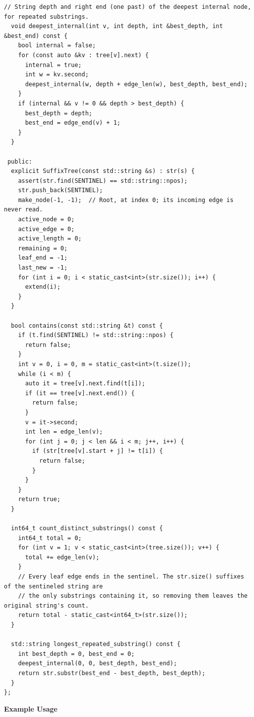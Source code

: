\begin{lstlisting}[style=cpp]
  // String depth and right end (one past) of the deepest internal node, for repeated substrings.
  void deepest_internal(int v, int depth, int &best_depth, int &best_end) const {
    bool internal = false;
    for (const auto &kv : tree[v].next) {
      internal = true;
      int w = kv.second;
      deepest_internal(w, depth + edge_len(w), best_depth, best_end);
    }
    if (internal && v != 0 && depth > best_depth) {
      best_depth = depth;
      best_end = edge_end(v) + 1;
    }
  }

 public:
  explicit SuffixTree(const std::string &s) : str(s) {
    assert(str.find(SENTINEL) == std::string::npos);
    str.push_back(SENTINEL);
    make_node(-1, -1);  // Root, at index 0; its incoming edge is never read.
    active_node = 0;
    active_edge = 0;
    active_length = 0;
    remaining = 0;
    leaf_end = -1;
    last_new = -1;
    for (int i = 0; i < static_cast<int>(str.size()); i++) {
      extend(i);
    }
  }

  bool contains(const std::string &t) const {
    if (t.find(SENTINEL) != std::string::npos) {
      return false;
    }
    int v = 0, i = 0, m = static_cast<int>(t.size());
    while (i < m) {
      auto it = tree[v].next.find(t[i]);
      if (it == tree[v].next.end()) {
        return false;
      }
      v = it->second;
      int len = edge_len(v);
      for (int j = 0; j < len && i < m; j++, i++) {
        if (str[tree[v].start + j] != t[i]) {
          return false;
        }
      }
    }
    return true;
  }

  int64_t count_distinct_substrings() const {
    int64_t total = 0;
    for (int v = 1; v < static_cast<int>(tree.size()); v++) {
      total += edge_len(v);
    }
    // Every leaf edge ends in the sentinel. The str.size() suffixes of the sentineled string are
    // the only substrings containing it, so removing them leaves the original string's count.
    return total - static_cast<int64_t>(str.size());
  }

  std::string longest_repeated_substring() const {
    int best_depth = 0, best_end = 0;
    deepest_internal(0, 0, best_depth, best_end);
    return str.substr(best_end - best_depth, best_depth);
  }
};
\end{lstlisting}
\textbf{Example Usage}\par
